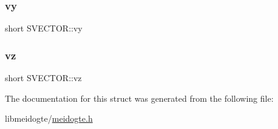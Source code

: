 \subsubsection{\texorpdfstring{vy}{vy}}
{\footnotesize\ttfamily short S\+V\+E\+C\+T\+O\+R\+::vy}

\mbox{\label{structSVECTOR_a0432603c6d01420022208d0aae7fb68a}} 
\subsubsection{\texorpdfstring{vz}{vz}}
{\footnotesize\ttfamily short S\+V\+E\+C\+T\+O\+R\+::vz}



The documentation for this struct was generated from the following file\+:\begin{DoxyCompactItemize}
\item 
libmeidogte/\hyperlink{meidogte_8h}{meidogte.\+h}\end{DoxyCompactItemize}
